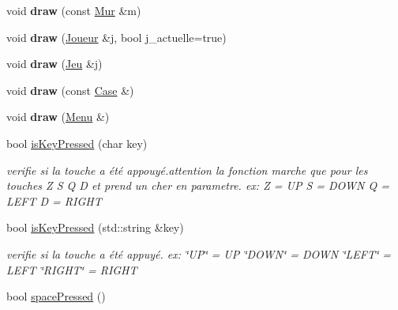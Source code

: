 \begin{DoxyCompactItemize}
void {\bfseries draw} (const \mbox{\hyperlink{class_mur}{Mur}} \&m)
\item 
\mbox{\label{class_fenetre_s_f_m_l_aae5c28d20b77100f15d109f452d3c89c}} 
void {\bfseries draw} (\mbox{\hyperlink{class_joueur}{Joueur}} \&j, bool j\+\_\+actuelle=true)
\item 
\mbox{\label{class_fenetre_s_f_m_l_a40d24e340cf80f10bcc902b9fe798f22}} 
void {\bfseries draw} (\mbox{\hyperlink{class_jeu}{Jeu}} \&j)
\item 
\mbox{\label{class_fenetre_s_f_m_l_ac79803b008b1993560167b66e284d7a4}} 
void {\bfseries draw} (const \mbox{\hyperlink{class_case}{Case}} \&)
\item 
\mbox{\label{class_fenetre_s_f_m_l_a0072469e0db5dbbbb85ec237e0657304}} 
void {\bfseries draw} (\mbox{\hyperlink{class_menu}{Menu}} \&)
\item 
bool \mbox{\hyperlink{class_fenetre_s_f_m_l_ac7c527412448d905ff45f7966b234196}{is\+Key\+Pressed}} (char key)
\begin{DoxyCompactList}\small\item\em verifie si la touche a été appouyé.\+attention la fonction marche que pour les touches Z S Q D et prend un cher en parametre. ex\+: Z = UP S = D\+O\+WN Q = L\+E\+FT D = R\+I\+G\+HT \end{DoxyCompactList}\item 
\mbox{\label{class_fenetre_s_f_m_l_a8b877cce4a0ee5aa65bf88fbfbb82697}} 
bool \mbox{\hyperlink{class_fenetre_s_f_m_l_a8b877cce4a0ee5aa65bf88fbfbb82697}{is\+Key\+Pressed}} (std\+::string \&key)
\begin{DoxyCompactList}\small\item\em verifie si la touche a été appuyé. ex\+: \char`\"{}\+U\+P\char`\"{} = UP \char`\"{}\+D\+O\+W\+N\char`\"{} = D\+O\+WN \char`\"{}\+L\+E\+F\+T\char`\"{} = L\+E\+FT \char`\"{}\+R\+I\+G\+H\+T\char`\"{} = R\+I\+G\+HT \end{DoxyCompactList}\item 
\mbox{\label{class_fenetre_s_f_m_l_a1c31f398710e536d43b095aa4f723f3e}} 
bool \mbox{\hyperlink{class_fenetre_s_f_m_l_a1c31f398710e536d43b095aa4f723f3e}{space\+Pressed}} ()

\end{DoxyCompactItemize}
